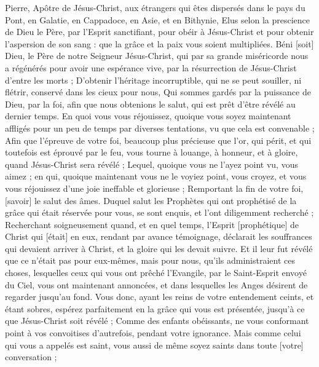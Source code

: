\BFont
\begin{multicols}{2}
\VerseOne{}Pierre, Apôtre de Jésus-Christ, aux étrangers qui êtes dispersés dans le pays du Pont, en Galatie, en Cappadoce, en Asie, et en Bithynie,
Elus selon la prescience de Dieu le Père, par l'Esprit sanctifiant, pour obéir à Jésus-Christ et pour obtenir l'aspersion de son sang : que la grâce et la paix vous soient multipliées.
Béni [soit] Dieu, le Père de notre Seigneur Jésus-Christ, qui par sa grande miséricorde nous a régénérés pour avoir une espérance vive, par la résurrection de Jésus-Christ d'entre les morts ;
D'obtenir l'héritage incorruptible, qui ne se peut souiller, ni flétrir, conservé dans les cieux pour nous,
Qui sommes gardés par la puissance de Dieu, par la foi, afin que nous obtenions le salut, qui est prêt d'être révélé au dernier temps.
En quoi vous vous réjouissez, quoique vous soyez maintenant affligés pour un peu de temps par diverses tentations, vu que cela est convenable ;
Afin que l'épreuve de votre foi, beaucoup plus précieuse que l'or, qui périt, et qui toutefois est éprouvé par le feu, vous tourne à louange, à honneur, et à gloire, quand Jésus-Christ sera révélé ;
Lequel, quoique vous ne l'ayez point vu, vous aimez ; en qui, quoique maintenant vous ne le voyiez point, vous croyez, et vous vous réjouissez d'une joie ineffable et glorieuse ;
Remportant la fin de votre foi, [savoir] le salut des âmes.
Duquel salut les Prophètes qui ont prophétisé de la grâce qui était réservée pour vous, se sont enquis, et l'ont diligemment recherché ;
Recherchant soigneusement quand, et en quel temps, l'Esprit [prophétique] de Christ qui [était] en eux, rendant par avance témoignage, déclarait les souffrances qui devaient arriver à Christ, et la gloire qui les devait suivre.
Et il leur fut révélé que ce n'était pas pour eux-mêmes, mais pour nous, qu'ils administraient ces choses, lesquelles ceux qui vous ont prêché l'Evangile, par le Saint-Esprit envoyé du Ciel, vous ont maintenant annoncées, et dans lesquelles les Anges désirent de regarder jusqu'au fond.
Vous donc, ayant les reins de votre entendement ceints, et étant sobres, espérez parfaitement en la grâce qui vous est présentée, jusqu'à ce que Jésus-Christ soit révélé ;
Comme des enfants obéissants, ne vous conformant point à vos convoitises d'autrefois, pendant votre ignorance.
Mais comme celui qui vous a appelés est saint, vous aussi de même soyez saints dans toute [votre] conversation ;

\end{multicols}
